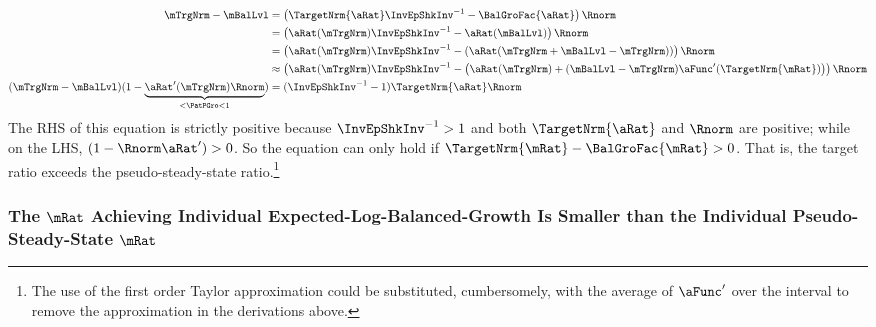 \documentclass[\econtexRoot/BufferStockTheory]{subfiles}
\begin{document}
\begin{equation}\begin{split}
  \mTrgNrm - \mBalLvl %
 & = \left(\TargetNrm{\aRat} \InvEpShkInv^{-1} - \BalGroFac{\aRat} \right)\Rnorm 
\\ & = \left({\aRat}(\mTrgNrm) \InvEpShkInv^{-1} - {\aRat}(\mBalLvl) \right)\Rnorm 
\\ & = \left({\aRat}(\mTrgNrm) \InvEpShkInv^{-1} - \left({\aRat}(\mTrgNrm+\mBalLvl-\mTrgNrm)\right) \right)\Rnorm 
\\ & \approx \left({\aRat}(\mTrgNrm) \InvEpShkInv^{-1} - \left({\aRat}(\mTrgNrm)+(\mBalLvl-\mTrgNrm)\aFunc^{\prime}(\TargetNrm{\mRat})\right) \right)\Rnorm 
  \\ (\mTrgNrm - \mBalLvl)(1-\underbrace{{\aRat}^{\prime}(\mTrgNrm)\Rnorm}_{< \PatPGro < 1}) & = (\InvEpShkInv^{-1} - 1)\TargetNrm{\aRat}\Rnorm
\end{split}\end{equation}
The RHS of this equation is strictly positive because $\InvEpShkInv^{-1}>1$ and both $\TargetNrm{\aRat}$ and $\Rnorm$ are positive; while on the LHS, $(1-\Rnorm\aRat^{\prime})>0$.  So the equation can only hold if $\TargetNrm{\mRat}-\BalGroFac{\mRat} > 0$.  That is, the target ratio exceeds the pseudo-steady-state ratio.\footnote{The use of the first order Taylor approximation could be substituted, cumbersomely, with the average of $\aFunc^{\prime}$ over the interval to remove the approximation in the derivations above.}

\subsubsection{The \texorpdfstring{$\mRat$}{m}  Achieving Individual Expected-Log-Balanced-Growth Is Smaller than the Individual Pseudo-Steady-State \texorpdfstring{$\mRat$}{m}}
\end{document}
